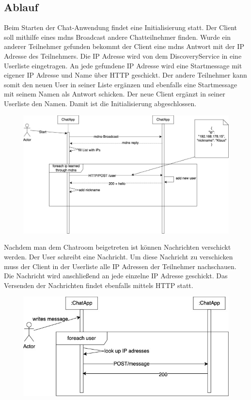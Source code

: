 \subsection{Ablauf}
Beim Starten der Chat-Anwendung findet eine Initialisierung statt. 
Der Client soll mithilfe eines mdns Broadcast andere Chatteilnehmer finden.
Wurde ein anderer Teilnehmer gefunden bekommt der Client eine mdns Antwort mit der IP Adresse des Teilnehmers.
Die IP Adresse wird von dem DiscoveryService in eine Userliste eingetragen. 
An jede gefundene IP Adresse wird eine Startmessage mit eigener IP Adresse und Name über HTTP geschickt. Der andere Teilnehmer kann somit den neuen 
User in seiner Liste ergänzen und ebenfalls eine Startmessage mit seinem Namen als Antwort schicken. Der neue Client ergänzt in seiner Userliste 
den Namen. Damit ist die Initialisierung abgeschlossen. 
\begin{figure}[h]
    \centering
    \includegraphics[scale=0.4]{Images/Initialisierung_Sequenzdiagramm.jpg}
\end{figure}
\newpage
Nachdem man dem Chatroom beigetreten ist können Nachrichten verschickt werden. Der User schreibt eine Nachricht. 
Um diese Nachricht zu verschicken muss der Client in der Userliste alle IP Adressen der Teilnehmer nachschauen. Die Nachricht wird anschließend 
an jede einzelne IP Adresse geschickt. Das Versenden der Nachrichten findet ebenfalls mittels HTTP statt.
\begin{figure}[ht]
    \centering
    \includegraphics[scale=0.4]{Images/Conversation_Sequenzdiagramm.jpg}
\end{figure}
